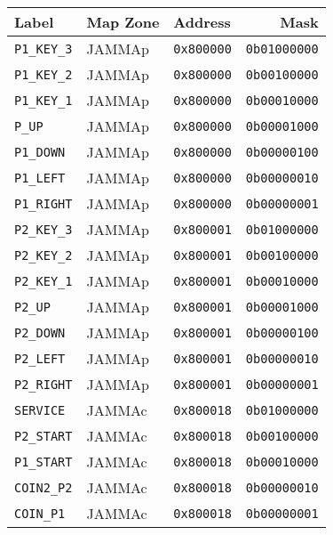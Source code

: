 \begin{tabularx}{\textwidth}{Xllr}
  \toprule    
  \textbf{Label } & \textbf{ Map Zone }  & \textbf{Address } & \textbf{Mask } \\               
  \toprule   
  
    \texttt{P1\_KEY\_3} & JAMMAp &    \texttt{0x800000} &  \texttt{0b01000000}    \\ 
      \texttt{P1\_KEY\_2} & JAMMAp &  \texttt{0x800000} &  \texttt{0b00100000}    \\  	
    \texttt{P1\_KEY\_1} & JAMMAp &    \texttt{0x800000} &  \texttt{0b00010000}    \\     
  \texttt{P\_UP}    & JAMMAp &        \texttt{0x800000} &  \texttt{0b00001000}    \\     
  \texttt{P1\_DOWN} & JAMMAp &  \texttt{0x800000} &  \texttt{0b00000100}    \\     
  \texttt{P1\_LEFT} & JAMMAp &  \texttt{0x800000} &  \texttt{0b00000010}    \\     
  \texttt{P1\_RIGHT} & JAMMAp &  \texttt{0x800000} &  \texttt{0b00000001}    \\     
 
  \toprule   
    \texttt{P2\_KEY\_3} & JAMMAp &  \texttt{0x800001}    &  \texttt{0b01000000}    \\     
  \texttt{P2\_KEY\_2} & JAMMAp &  \texttt{0x800001}    &    \texttt{0b00100000}    \\     
  \texttt{P2\_KEY\_1} & JAMMAp &  \texttt{0x800001}    &    \texttt{0b00010000}    \\    
  \texttt{P2\_UP}    & JAMMAp &  \texttt{0x800001}    &     \texttt{0b00001000}    \\     
  \texttt{P2\_DOWN} & JAMMAp &  \texttt{0x800001}    &      \texttt{0b00000100}    \\     
  \texttt{P2\_LEFT} & JAMMAp &  \texttt{0x800001}    &      \texttt{0b00000010}    \\     
  \texttt{P2\_RIGHT} & JAMMAp &  \texttt{0x800001}    &     \texttt{0b00000001}    \\     

  \toprule   
  \texttt{SERVICE} & JAMMAc &  \texttt{0x800018}       &     \texttt{0b01000000}    \\ 
   \texttt{P2\_START} & JAMMAc &  \texttt{0x800018}   &      \texttt{0b00100000}    \\ 
   \texttt{P1\_START} & JAMMAc &  \texttt{0x800018}   &      \texttt{0b00010000}    \\   
     \texttt{COIN2\_P2} & JAMMAc &  \texttt{0x800018}    &   \texttt{0b00000010}    \\  
   \texttt{COIN\_P1} & JAMMAc &  \texttt{0x800018}       &   \texttt{0b00000001}    \\      
     


\end{tabularx}
